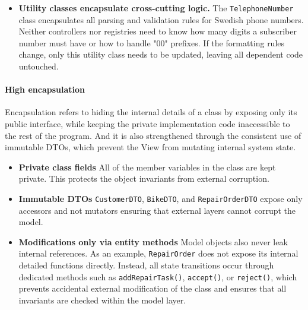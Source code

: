 \documentclass[a4paper]{scrartcl}
\begin{document}
\begin{itemize}
        Because DTOs such as \texttt{CustomerDTO}, \texttt{RepairOrderDTO}, and \texttt{DiagnosticTaskDTO} are immutable, controllers and views cannot accidentally modify model state. For example, the view may display a \texttt{RepairOrderDTO}, but modifying it has no effect on the underlying \texttt{RepairOrder} entity. This reduces coupling by preventing accidental back-references or shared mutable data.
  \item \textbf{Utility classes encapsulate cross-cutting logic.}  
        The \texttt{TelephoneNumber} class encapsulates all parsing and validation rules for Swedish phone numbers. Neither controllers nor registries need to  know how many digits a subscriber number must have or how to handle "00" prefixes. If the formatting rules change, only this utility class needs to be updated, leaving all dependent code untouched.
\end{itemize}


\paragraph{High encapsulation} Encapsulation refers to hiding the internal details of a class by exposing only its public interface, while keeping the private implementation code inaccessible to the rest of the program. And it is also strengthened through the consistent use of immutable DTOs, which prevent the View from mutating internal system state.

\begin{itemize}
  \item \textbf{Private class fields} All of the member variables in the class are kept private. This protects the object invariants from external corruption.
  \item \textbf{Immutable DTOs} \texttt{CustomerDTO}, \texttt{BikeDTO}, and \texttt{RepairOrderDTO} expose only accessors and not mutators ensuring that external layers cannot corrupt the model.
  \item \textbf{Modifications only via entity methods} Model objects also never leak internal references. As an example, \texttt{RepairOrder} does not expose its internal detailed functions directly. Instead, all state transitions occur through dedicated methods such as \texttt{addRepairTask()}, \texttt{accept()}, or \texttt{reject()}, which prevents accidental external modification of the class and ensures that all invariants are checked within the model layer.
\end{itemize}
\end{document}
